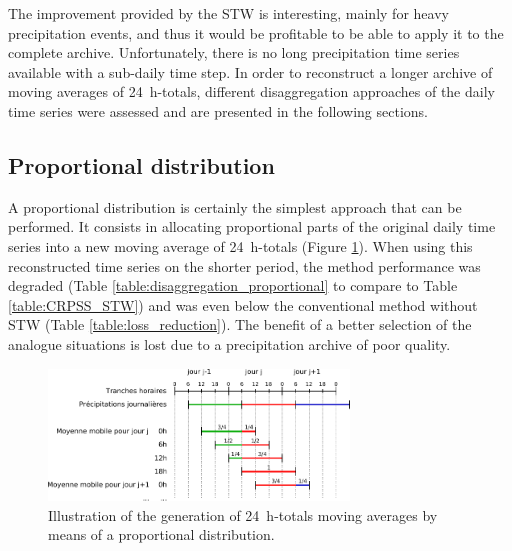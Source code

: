 \documentclass[hess]{copernicus}
\begin{document}
The improvement provided by the STW is interesting, mainly for heavy precipitation events, and thus it would be profitable to be able to apply it to the complete archive. Unfortunately, there is no long precipitation time series available with a sub-daily time step. In order to reconstruct a longer archive of moving averages of 24~h-totals, different disaggregation approaches of the daily time series were assessed and are presented in the following sections.

\subsection{Proportional distribution}

A proportional distribution is certainly the simplest approach that can be performed. It consists in allocating proportional parts of the original daily time series into a new moving average of 24~h-totals (Figure \ref{fig:illustration_disaggregation}). When using this reconstructed time series on the shorter period, the method performance was degraded (Table \ref{table:disaggregation_proportional} to compare to Table \ref{table:CRPSS_STW}) and was even below the conventional method without STW (Table \ref{table:loss_reduction}). The benefit of a better selection of the analogue situations is lost due to a precipitation archive of poor quality.

\begin{figure}[htb]
	\begin{center}
		\includegraphics[width=8cm]{figures/illustration_disaggregation.pdf}
	\end{center}
	\caption{Illustration of the generation of 24~h-totals moving averages by means of a proportional distribution.}
	\label{fig:illustration_disaggregation}
\end{figure}
\end{document}
